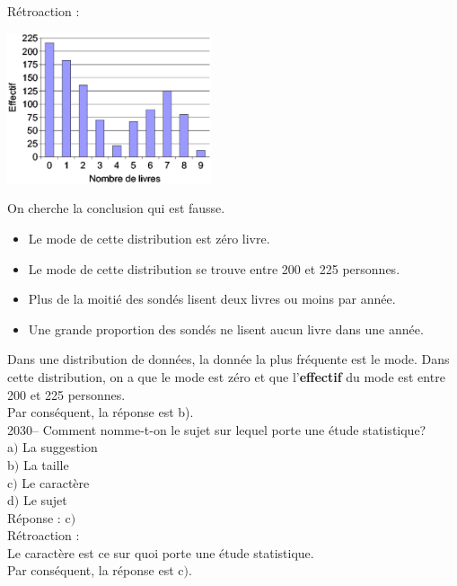 \documentclass[letterpaper, 12pt]{article}
\begin{document}
R\'etroaction :
\begin{center}
 \includegraphics[width=6cm]{GraphLivreEPS.eps}
\end{center}
On cherche la conclusion qui est fausse.\\
\begin{itemize}
 \item Le mode de cette distribution est z\'ero livre.
 \item Le mode de cette distribution se trouve entre 200 et 225 personnes.
 \item Plus de la moiti\'e des sond\'es lisent deux livres ou moins par ann\'ee.
 \item Une grande proportion des sond\'es ne lisent aucun livre dans une ann\'ee.\\
\end{itemize}
Dans une distribution de donn\'ees, la donn\'ee la plus fr\'equente est le mode. Dans cette distribution, on a que le mode est z\'ero et que l'\textbf{effectif} du mode est entre 200 et 225 personnes.\\
Par cons\'equent, la r\'eponse est b).\\


2030-- Comment nomme-t-on le sujet sur lequel porte une \'etude statistique?\\

a$)$ La suggestion\\
b$)$ La taille\\
c$)$ Le caract\`ere\\
d$)$ Le sujet\\

R\'eponse : c$)$\\

R\'etroaction :\\
Le caract\`ere est ce sur quoi porte une \'etude statistique.\\
Par cons\'equent, la r\'eponse est c$)$.\\
\end{document}
